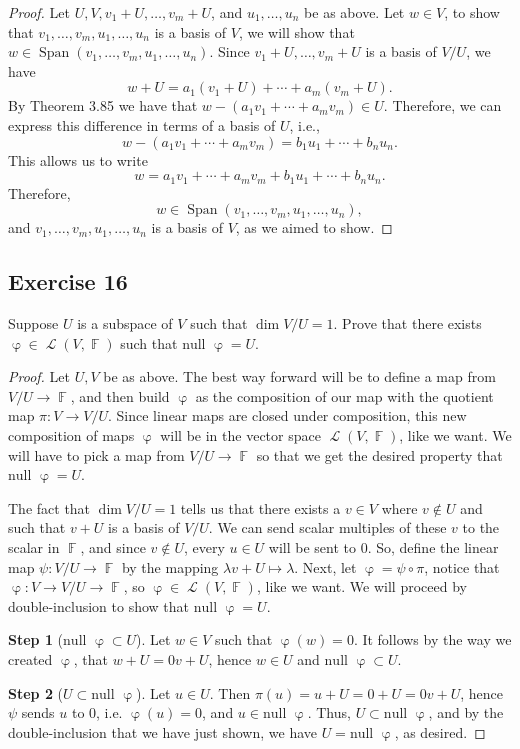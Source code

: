 \documentclass[letterpaper, 12pt]{amsart}
\DeclareMathOperator{\F}{\mathbb{F}}				%
\DeclareMathOperator{\Ell}{\mathscr{L}}				%
\DeclareMathOperator{\ph}{\varphi}					%
\renewcommand{\null}{\text{null }}					%
\DeclareMathOperator{\Span}{Span}					%
\theoremstyle{definition}  							%
\begin{document}
		\begin{proof}
		Let $U, V, v_{1} + U, \dots, v_{m} + U$, and $u_{1}, \dots, u_{n}$ be as above.
		Let $w \in V$, to show that $v_{1}, \dots, v_{m},u_{1}, \dots, u_{n}$ is a basis of $V$, we will show that $w \in \Span(v_{1}, \dots, v_{m},u_{1}, \dots, u_{n})$.
		Since $v_{1} + U, \dots, v_{m} + U$ is a basis of $V/U$, we have $$w + U = a_{1}(v_{1} + U) + \cdots + a_{m}(v_{m}+U).$$ By Theorem 3.85 we have that $w - (a_{1}v_{1} + \cdots + a_{m}v_{m}) \in U$.
		Therefore, we can express this difference in terms of a basis of $U$, i.e., $$w - (a_{1}v_{1} + \cdots + a_{m}v_{m}) = b_{1}u_{1} + \cdots + b_{n}u_{n}.$$ 
		This allows us to write $$w = a_{1}v_{1} + \cdots + a_{m}v_{m} + b_{1}u_{1} + \cdots + b_{n}u_{n}.$$ 
		Therefore, $$w \in \Span(v_{1}, \dots, v_{m},u_{1}, \dots,u_{n}),$$ and $v_{1}, \dots, v_{m},u_{1}, \dots, u_{n}$ is a basis of $V$, as we aimed to show.
		\end{proof}

		\subsection*{Exercise 16}
		Suppose $U$ is a subspace of $V$ such that $\dim V/U = 1$. 
		Prove that there exists $\ph \in \Ell(V, \F)$ such that $\null \ph = U$.

		\begin{proof}
		Let $U,V$ be as above.
		The best way forward will be to define a map from $V/U \to \F$, and then build $\ph$ as the composition of our map with the quotient map $\pi : V \to V/U$.
		Since linear maps are closed under composition, this new composition of maps $\ph$ will be in the vector space $\Ell(V, \F)$, like we want.
		We will have to pick a map from $V/U \to \F$ so that we get the desired property that $\null \ph = U$.

		The fact that $\dim V/U = 1$ tells us that there exists a $v \in V$ where $v \notin U$ and such that $v + U$ is a basis of $V/U$.
		We can send scalar multiples of these $v$ to the scalar in $\F$, and since $v \notin U$, every $u \in U$ will be sent to $0$.
		So, define the linear map $\psi : V/U \to \F$ by the mapping $\lambda v + U \mapsto \lambda$.
		Next, let $\ph = \psi \circ \pi$, notice that $\ph : V \to V/U \to \F$, so $\ph \in \Ell(V,\F)$, like we want.
		We will proceed by double-inclusion to show that $\null \ph = U$.

		\textbf{Step 1} ($\null \ph \subset U$).
		Let $w \in V$ such that $\ph(w) = 0$.
		It follows by the way we created $\ph$, that $w + U = 0v + U$, hence $w \in U$ and $\null \ph \subset U$.

		\textbf{Step 2} ($U \subset \null \ph$).
		Let $u \in U$.
		Then $\pi(u) = u + U = 0 + U = 0v + U$, hence $\psi$ sends $u$ to $0$, i.e. $\ph(u) = 0$, and $u \in \null \ph$.
		Thus, $U \subset \null \ph$, and by the double-inclusion that we have just shown, we have $U = \null \ph$, as desired.
		\end{proof}
\end{document}
